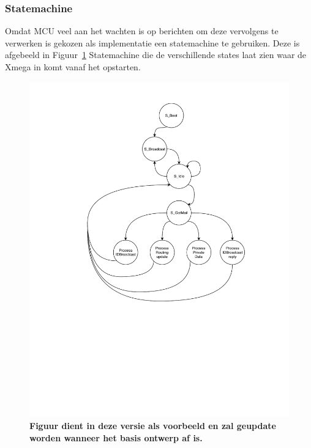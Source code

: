 \subsubsection{Statemachine}
Omdat MCU veel aan het wachten is op berichten om deze vervolgens te verwerken is gekozen als implementatie een statemachine te gebruiken. Deze is afgebeeld in Figuur~\ref{fig:Statemachine} 
Statemachine die de verschillende states laat zien waar de Xmega in komt vanaf het opstarten.
\begin{figure}[!h]
	\includegraphics[width=.8\textwidth, keepaspectratio]{App2/media/Pstate.pdf}
    \caption{ \textbf{Figuur dient in deze versie als voorbeeld en zal geupdate worden wanneer het basis ontwerp af is.}}
    \label{fig:Statemachine}
\end{figure}